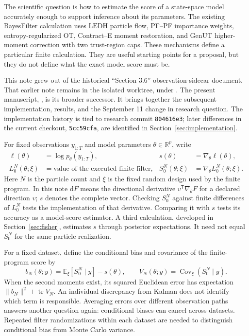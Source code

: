 \documentclass[11pt]{article}
\newcommand{\R}{\mathbb{R}}
\newcommand{\dd}{\mathrm{d}}
\newcommand{\LEDH}{\ensuremath{\mathrm{LEDH}}}
\newcommand{\GenUT}{\ensuremath{\mathrm{GenUT}}}
\newcommand{\OT}{\ensuremath{\mathrm{OT}}}
\begin{document}
The scientific question is how to estimate the score of a state-space model
accurately enough to support inference about its parameters. The existing
BayesFilter calculation uses \LEDH{} particle flow, PF--PF importance weights,
entropy-regularized \OT{}, Contract--E moment restoration, and \GenUT{}
higher-moment correction with two trust-region caps. These mechanisms define
a particular finite calculation. They are useful starting points for a
proposal, but they do not define what the exact model score must be.

This note grew out of the historical ``Section 3.6'' observation-sidecar
document. That earlier note remains in the isolated
 worktree, under
. The present manuscript,
, is its
broader successor. It brings together the subsequent implementation, results,
and the September 11 change in research question. The implementation history
is tied to research commit \texttt{804616e3}; later differences in the current
checkout, \texttt{5cc59cfa}, are identified in Section~\ref{sec:implementation}.

For fixed observations $y_{1:T}$ and model parameters $\theta\in\R^p$, write
\begin{align}
 \ell(\theta)&=\log p_\theta(y_{1:T}), &
 s(\theta)&=\nabla_\theta\ell(\theta), \label{eq:exact-score}\\
 L_0^N(\theta;\xi)&=\text{value of the executed finite filter}, &
 S_0^N(\theta;\xi)&=\nabla_\theta L_0^N(\theta;\xi).
 \label{eq:finite-score}
\end{align}
Here $N$ is the particle count and $\xi$ is the fixed random design used by
the finite program. In this note $\dd F$ means the directional derivative
$v^\mathsf{T}\nabla_\theta F$ for a declared direction $v$; $s$ denotes the
complete vector. Checking $S_0^N$ against finite differences of $L_0^N$ tests
the implementation of that derivative. Comparing it with $s$ tests its
accuracy as a model-score estimator. A third calculation, developed in
Section~\ref{sec:fisher}, estimates $s$ through posterior expectations. It
need not equal $S_0^N$ for the same particle realization.

For a fixed dataset, define the conditional bias and covariance of the
finite-program score by
\begin{equation}
 b_N(\theta;y)=\mathbb E_\xi[S_0^N\mid y]-s(\theta),\qquad
 V_N(\theta;y)=\operatorname{Cov}_\xi(S_0^N\mid y).
 \label{eq:conditional-score-error}
\end{equation}
When the second moments exist, its squared Euclidean error has expectation
$\|b_N\|^2+\operatorname{tr}V_N$. An individual discrepancy from Kalman does
not identify which term is responsible. Averaging errors over different
observation paths answers another question again: conditional biases can
cancel across datasets. Repeated filter randomizations within each dataset
are needed to distinguish conditional bias from Monte Carlo variance.
\end{document}
